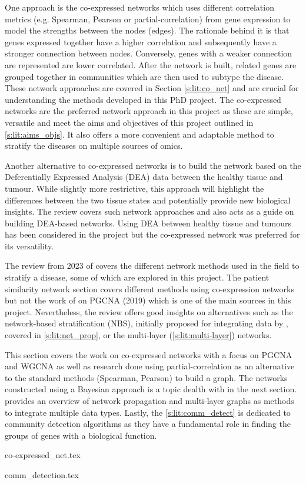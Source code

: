 One approach is the co-expressed networks which uses different correlation metrics (e.g. Spearman, Pearson or partial-correlation) from gene expression to model the strengths between the nodes (edges). The rationale behind it is that genes expressed together have a higher correlation and subsequently have a stronger connection between nodes. Conversely, genes with a weaker connection are represented are lower correlated. After the network is built, related genes are grouped together in communities which are then used to subtype the disease. These network approaches are covered in Section \ref{s:lit:co_net} and are crucial for understanding the methods developed in this PhD project. The co-expressed networks are the preferred network approach in this project as these are simple, versatile and meet the aims and objectives of this project outlined in \cref{s:lit:aims_objs}. It also offers a more convenient and adaptable method to stratify the diseases on multiple sources of omics.

Another alternative to co-expressed networks is to build the network based on the Deferentially Expressed Analysis (DEA) data between the healthy tissue and tumour. While slightly more restrictive, this approach will highlight the differences between the two tissue states and potentially provide new biological insights. The review \citet{Van_Dam2018-id} covers such network approaches and also acts as a guide on building DEA-based networks. Using DEA between healthy tissue and tumours has been considered in the project but the co-expressed network was preferred for its versatility.

The review from 2023 of \citet{Petti2023-qo} covers the different network methods used in the field to stratify a disease, some of which are explored in this project. The patient similarity network section covers different methods using co-expression networks but not the work of \citet{Care2019-ij} on PGCNA (2019) which is one of the main sources in this project. Nevertheless, the review offers good insights on alternatives such as the network-based stratification (NBS), initially proposed for integrating data by \citet{Hofree2013-ld}, covered in \cref{s:lit:net_prop}, or the multi-layer (\cref{s:lit:multi-layer}) networks.

This section covers the work on co-expressed networks with a focus on PGCNA and WGCNA as well as research done using partial-correlation as an alternative to the standard methods (Spearman, Pearson) to build a graph. The networks constructed using a Bayesian approach is a topic dealth with in the next section.  provides an overview of network propagation and multi-layer graphs as methods to integrate multiple data types. Lastly, the \cref{s:lit:comm_detect} is dedicated to community detection algorithms as they have a fundamental role in finding the groups of genes with a biological function.

{co-expressed_net.tex}

{comm_detection.tex}





